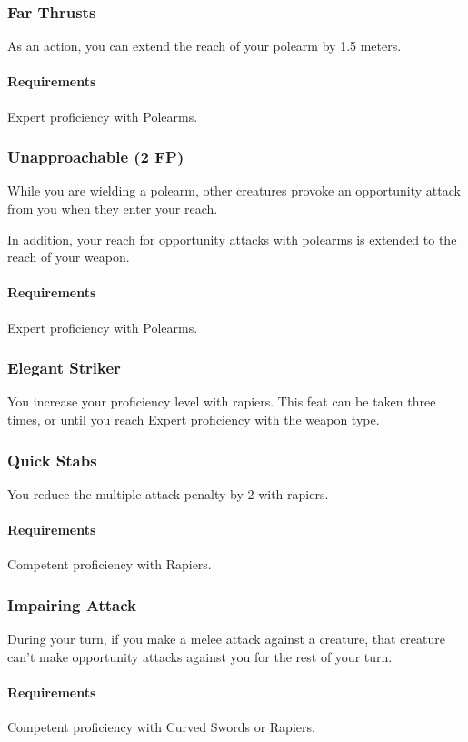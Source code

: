 \subsubsection{Far Thrusts} \label{feat::farthrusts}
    As an action, you can extend the reach of your polearm by 1.5 meters.
    \paragraph{Requirements} Expert proficiency with Polearms.
\subsubsection{Unapproachable (2 FP)} \label{feat::unapproachable}
    While you are wielding a polearm, other creatures provoke an opportunity attack from you when they enter your reach.

    In addition, your reach for opportunity attacks with polearms is extended to the reach of your weapon.
    \paragraph{Requirements} Expert proficiency with Polearms.
\subsubsection{Elegant Striker} \label{feat::elegantstriker}
    You increase your proficiency level with rapiers.
    This feat can be taken three times, or until you reach Expert proficiency with the weapon type.
\subsubsection{Quick Stabs} \label{feat::quickstabs}
    You reduce the multiple attack penalty by 2 with rapiers.
    \paragraph{Requirements} Competent proficiency with Rapiers.
\subsubsection{Impairing Attack} \label{feat::impairingattack}
    During your turn, if you make a melee attack against a creature, that creature can't make opportunity attacks against you for the rest of your turn.
    \paragraph{Requirements} Competent proficiency with Curved Swords or Rapiers.
